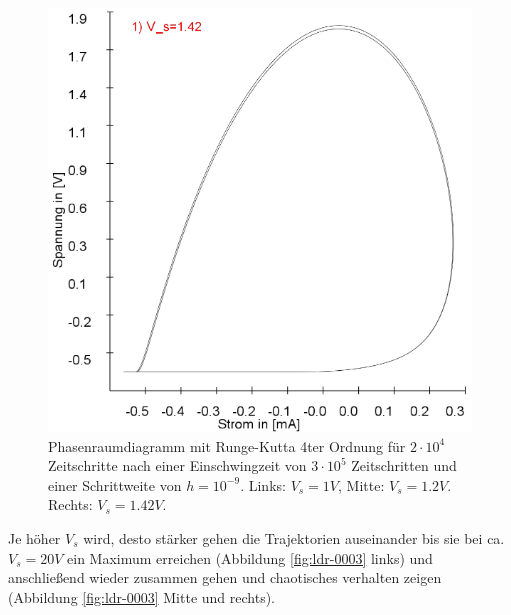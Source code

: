 \documentclass[12pt,a4paper]{article}
\begin{document}
\begin{figure}[!htbp]
\includegraphics[scale=0.28]{schwing-runge-nach300k-weitere20k-10-9-1,42V}
\caption{Phasenraumdiagramm mit Runge-Kutta 4ter Ordnung für $2\cdot10^4$ Zeitschritte nach einer Einschwingzeit von  $3\cdot10^5$ Zeitschritten und einer Schrittweite von $h=10^{-9}$. Links: $V_s=1V$, Mitte: $V_s=1.2V$. Rechts: $V_s=1.42V$.}
\label{fig:ldr-0002}
\end{figure}
Je höher $V_s$ wird, desto stärker gehen die Trajektorien auseinander bis sie bei ca. $V_s=20V$ ein Maximum erreichen (Abbildung \ref{fig:ldr-0003} links) und anschließend wieder zusammen gehen und chaotisches verhalten zeigen (Abbildung \ref{fig:ldr-0003} Mitte und rechts).
\end{document}
